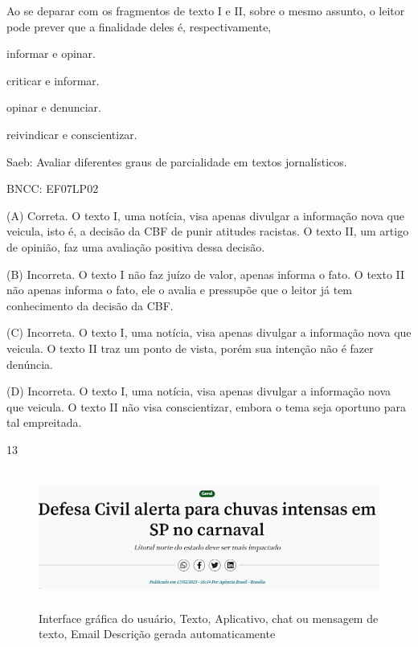 Ao se deparar com os fragmentos de texto I e II, sobre o mesmo assunto,
o leitor pode prever que a finalidade deles é, respectivamente,

\begin{escolha}
\item informar e opinar.

\item criticar e informar.

\item opinar e denunciar.

\item reivindicar e conscientizar.
\end{escolha}

Saeb: Avaliar diferentes graus de parcialidade em textos jornalísticos.

BNCC: EF07LP02

(A) Correta. O texto I, uma notícia, visa apenas divulgar a informação
nova que veicula, isto é, a decisão da CBF de punir atitudes racistas. O
texto II, um artigo de opinião, faz uma avaliação positiva dessa
decisão.

(B) Incorreta. O texto I não faz juízo de valor, apenas informa o fato.
O texto II não apenas informa o fato, ele o avalia e pressupõe que o
leitor já tem conhecimento da decisão da CBF.

(C) Incorreta. O texto I, uma notícia, visa apenas divulgar a informação
nova que veicula. O texto II traz um ponto de vista, porém sua intenção
não é fazer denúncia.

(D) Incorreta. O texto I, uma notícia, visa apenas divulgar a informação
nova que veicula. O texto II não visa conscientizar, embora o tema seja
oportuno para tal empreitada.

\num{13}

\begin{figure}
\centering
\includegraphics[width=5.90556in,height=1.78681in]{./imgSAEB_8_POR/media/image4.png}
\caption{Interface gráfica do usuário, Texto, Aplicativo, chat ou
mensagem de texto, Email Descrição gerada automaticamente}
\end{figure}

